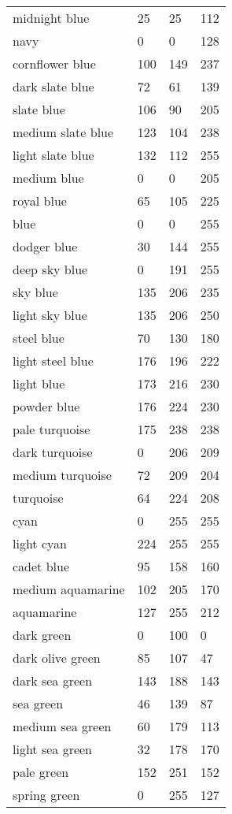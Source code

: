 \begin{center}
\begin{tabular}{llll}
  midnight blue & 25 & 25 & 112  \\
  navy & 0 & 0 & 128  \\
  cornflower blue & 100 & 149 & 237  \\
  dark slate blue & 72 & 61 & 139  \\
  slate blue & 106 & 90 & 205  \\
  medium slate blue & 123 & 104 & 238  \\
  light slate blue & 132 & 112 & 255  \\
  medium blue & 0 & 0 & 205  \\
  royal blue & 65 & 105 & 225  \\
  blue & 0 & 0 & 255  \\
  dodger blue & 30 & 144 & 255  \\
  deep sky blue & 0 & 191 & 255  \\
  sky blue & 135 & 206 & 235  \\
  light sky blue & 135 & 206 & 250  \\
  steel blue & 70 & 130 & 180  \\
  light steel blue & 176 & 196 & 222  \\
  light blue & 173 & 216 & 230  \\
  powder blue & 176 & 224 & 230  \\
  pale turquoise & 175 & 238 & 238  \\
  dark turquoise & 0 & 206 & 209  \\
  medium turquoise & 72 & 209 & 204  \\
  turquoise & 64 & 224 & 208  \\
  cyan & 0 & 255 & 255  \\
  light cyan & 224 & 255 & 255  \\
  cadet blue & 95 & 158 & 160  \\
  medium aquamarine & 102 & 205 & 170  \\
  aquamarine & 127 & 255 & 212  \\
  dark green & 0 & 100 & 0  \\
  dark olive green & 85 & 107 & 47  \\
  dark sea green & 143 & 188 & 143  \\
  sea green & 46 & 139 & 87  \\
  medium sea green & 60 & 179 & 113  \\
  light sea green & 32 & 178 & 170  \\
  pale green & 152 & 251 & 152  \\
  spring green & 0 & 255 & 127  \\

\end{tabular}
\end{center}
